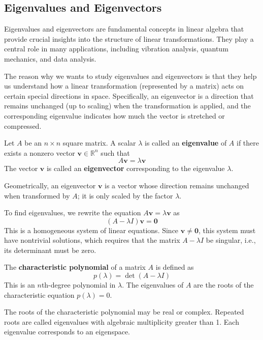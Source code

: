 \subsection{Eigenvalues and Eigenvectors}

Eigenvalues and eigenvectors are fundamental concepts in linear algebra that provide crucial insights into the structure of linear transformations. They play a central role in many applications, including vibration analysis, quantum mechanics, and data analysis.

The reason why we wants to study eigenvalues and eigenvectors is that they help us understand how a linear transformation (represented by a matrix) acts on certain special directions in space. Specifically, an eigenvector is a direction that remains unchanged (up to scaling) when the transformation is applied, and the corresponding eigenvalue indicates how much the vector is stretched or compressed.

\begin{definition}
Let $A$ be an $n \times n$ square matrix. A scalar $\lambda$ is called an \textbf{eigenvalue} of $A$ if there exists a nonzero vector $\mathbf{v} \in \mathbb{R}^n$ such that
\[
A\mathbf{v} = \lambda \mathbf{v}
\]
The vector $\mathbf{v}$ is called an \textbf{eigenvector} corresponding to the eigenvalue $\lambda$.
\end{definition}

Geometrically, an eigenvector $\mathbf{v}$ is a vector whose direction remains unchanged when transformed by $A$; it is only scaled by the factor $\lambda$.

To find eigenvalues, we rewrite the equation $A\mathbf{v} = \lambda \mathbf{v}$ as
\[
(A - \lambda I)\mathbf{v} = \mathbf{0}
\]
This is a homogeneous system of linear equations. Since $\mathbf{v} \neq \mathbf{0}$, this system must have nontrivial solutions, which requires that the matrix $A - \lambda I$ be singular, i.e., its determinant must be zero.

\begin{definition}
The \textbf{characteristic polynomial} of a matrix $A$ is defined as
\[
p(\lambda) = \det(A - \lambda I)
\]
This is an $n$th-degree polynomial in $\lambda$. The eigenvalues of $A$ are the roots of the characteristic equation $p(\lambda) = 0$.
\end{definition}

The roots of the characteristic polynomial may be real or complex. Repeated roots are called eigenvalues with algebraic multiplicity greater than 1. Each eigenvalue corresponds to an eigenspace.

